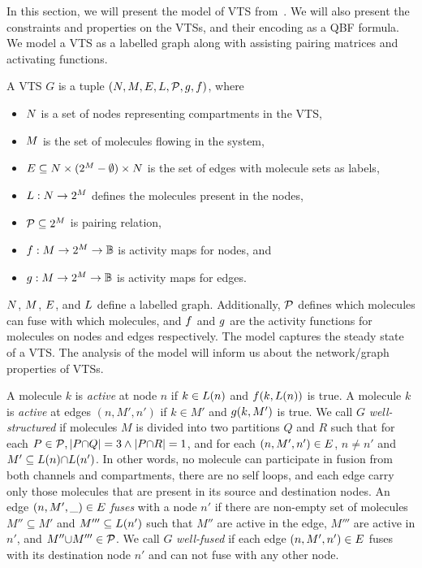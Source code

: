 In this section, we will present the model of VTS from~\cite{smtVTS}.
%
We will also present the constraints and properties on the VTSs, and their
encoding as a QBF formula.   
%
We model a VTS as a labelled graph along with assisting pairing matrices and
activating functions.

\begin{df}
  A VTS $G$ is a tuple $(N,M,E,L,\mathcal{P},g,f)$, where
  \begin{itemize}
  \item $N$ is a set of nodes representing compartments in the VTS,
  \item $M$ is the set of molecules flowing in the system, 
  \item $E \subseteq N \times (2^{M}-\emptyset) \times N$ is the
    set of edges with molecule sets as labels,
  \item $L : N \rightarrow 2^{M}$ defines the molecules present in the nodes,
  \item $\mathcal{P} \subseteq 2^{M}$ is pairing relation,
  \item $f : M \rightarrow 2^{M} \rightarrow \mathbb{B}$ is activity maps for nodes, and
  \item $g : M \rightarrow 2^{M} \rightarrow \mathbb{B} $ is activity maps for edges.
  \end{itemize}
\end{df}
$N$, $M$, $E$, and $L$ define a labelled graph.
%
Additionally, $\mathcal{P}$ defines which molecules can fuse with which molecules,
and
$f$ and $g$ are the activity functions for molecules on
nodes and edges respectively.
%
The model captures the steady state of a VTS.
%
The analysis of the model will inform us about the network/graph
properties of VTSs.

%
A molecule $k$ is {\em active} at node $n$ if $k \in L(n)$ and
$f(k,L(n))$ is true.
%
A molecule $k$ is {\em active} at edges $(n,M',n')$ if $k \in M'$ and
$g(k,M')$ is true.
%
We call $G$ {\em well-structured} if molecules $M$ is divided into
two partitions $Q$ and $R$ such that
for each $P \in \mathcal{P}, |P {\cap} Q| = 3 \land |P {\cap} R| = 1 $, and
for each $(n,M',n') \in E$, $n \neq n'$ and
$M' \subseteq L(n) {\cap} L(n')$.
%
In other words,
no molecule can participate in fusion from both channels and
compartments,
%
there are no self loops, and 
each edge carry only those molecules that are present in its source
and destination nodes. 
%
An edge $(n,M',\_) \in E$ {\em fuses} with a node $n'$
if there are non-empty set of molecules $M'' \subseteq M'$ and $M''' \subseteq L(n')$
such that $M''$ are active in the edge, $M'''$ are active in $n'$, and $M'' {\cup} M''' \in \mathcal{P}$.
%
We call $G$ {\em well-fused} if each edge $(n,M',n') \in E$ fuses
with its destination node $n'$
and can not fuse with any other node.

